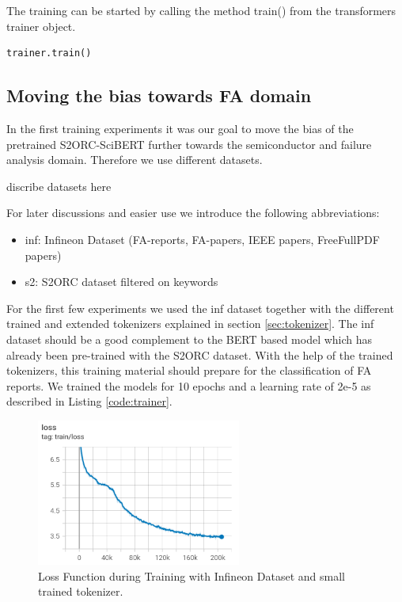 The training can be started by calling the method train() from the \alert{transformers trainer object.}
\begin{code}
	\label{code:train}
\begin{verbatim}
trainer.train()
\end{verbatim}
\end{code}

\subsection{Moving the bias towards FA domain}
In the first training experiments it was our goal to move the bias of the pretrained S2ORC-SciBERT further towards the semiconductor and failure analysis domain. Therefore we use different datasets. 

\alert{discribe datasets here}

For later discussions and easier use we introduce the following abbreviations:
\begin{itemize}
	\item inf: Infineon Dataset (FA-reports, FA-papers, IEEE papers, FreeFullPDF papers)
	\item s2: S2ORC dataset filtered on keywords
\end{itemize}

For the first few experiments we used the inf dataset together with the different trained and extended tokenizers explained in section \ref{sec:tokenizer}. The inf dataset should be a good complement to the BERT based model which has already been pre-trained with the S2ORC dataset. With the help of the trained tokenizers, this training material should prepare for the classification of FA reports. We trained the models for 10 epochs and a learning rate of 2e-5 as described in Listing \ref{code:trainer}.

\begin{figure}[H]
	\centering
	\includegraphics[width=0.6\textwidth]{figures/loss_inf_small.png}
	\caption{Loss Function during Training with Infineon Dataset and small trained tokenizer.}
	\label{fig:loss_small}
\end{figure}

